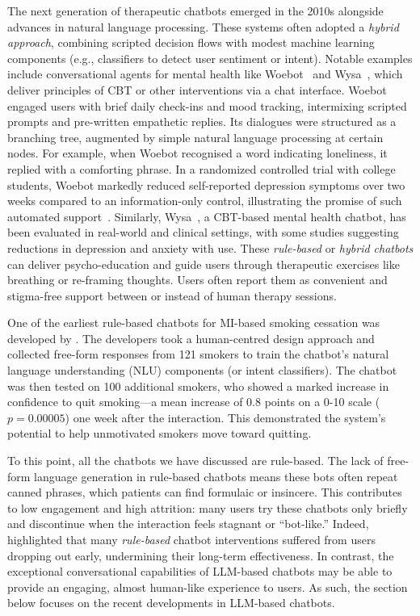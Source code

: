 The next generation of therapeutic chatbots emerged in the 2010s alongside advances in natural language processing. These systems often adopted a \emph{hybrid approach}, combining scripted decision flows with modest machine learning components (e.g., classifiers to detect user sentiment or intent). Notable examples include conversational agents for mental health like Woebot~\cite{Fitzpatrick2017} and Wysa~\cite{Chang2024}, which deliver principles of CBT or other interventions via a chat interface. Woebot engaged users with brief daily check-ins and mood tracking, intermixing scripted prompts and pre-written empathetic replies. Its dialogues were structured as a branching tree, augmented by simple natural language processing at certain nodes. For example, when Woebot recognised a word indicating loneliness, it replied with a comforting phrase. In a randomized controlled trial with college students, Woebot markedly reduced self-reported depression symptoms over two weeks compared to an information-only control, illustrating the promise of such automated support~\cite{Fitzpatrick2017}. Similarly, Wysa~\cite{Chang2024}, a CBT-based mental health chatbot, has been evaluated in real-world and clinical settings, with some studies suggesting reductions in depression and anxiety with use. These \emph{rule-based} or \emph{hybrid chatbots} can deliver psycho-education and guide users through therapeutic exercises like breathing or re-framing thoughts. Users often report them as convenient and stigma-free support between or instead of human therapy sessions.

One of the earliest rule-based chatbots for MI-based smoking cessation was developed by \citet{Almusharraf_2019}. The developers took a human-centred design approach and collected free-form responses from 121 smokers to train the chatbot's natural language understanding (NLU) components (or intent classifiers). The chatbot was then tested on 100 additional smokers, who showed a marked increase in confidence to quit smoking---a mean increase of 0.8 points on a 0-10 scale ($p=0.00005$) one week after the interaction. This demonstrated the system's potential to help unmotivated smokers move toward quitting.

To this point, all the chatbots we have discussed are rule-based. The lack of free-form language generation in rule-based chatbots means these bots often repeat canned phrases, which patients can find formulaic or insincere. This contributes to low engagement and high attrition: many users try these chatbots only briefly and discontinue when the interaction feels stagnant or ``bot-like.'' Indeed, \citet{LIMPANOPPARAT2024100081} highlighted that many \emph{rule-based} chatbot interventions suffered from users dropping out early, undermining their long-term effectiveness. In contrast, the exceptional conversational capabilities of LLM-based chatbots may be able to provide an engaging, almost human-like experience to users. As such, the section below focuses on the recent developments in LLM-based chatbots.


